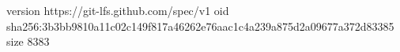 version https://git-lfs.github.com/spec/v1
oid sha256:3b3bb9810a11c02c149f817a46262e76aac1c4a239a875d2a09677a372d83385
size 8383
